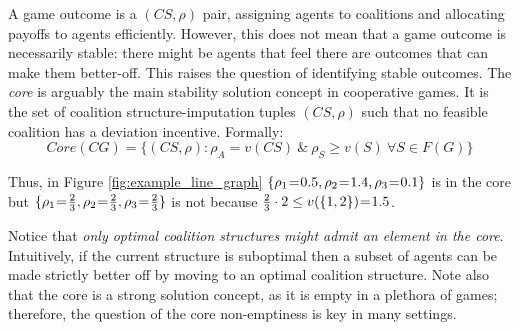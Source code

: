 \documentclass{aamas2012}
\begin{document}
A game outcome is a $(CS,\rho)$ pair, assigning agents to
coalitions and allocating payoffs to agents efficiently. However, this does not
mean that a game outcome is necessarily stable: there might be agents that feel
there are outcomes that can make them better-off. This raises the question of
identifying stable outcomes. The {\em core} is arguably the main stability
solution concept in cooperative games. It is the set of coalition
structure-imputation tuples $(CS, \rho)$ such that no feasible coalition has a
deviation incentive. Formally:
$$
Core(CG) = \{ (CS,\rho) : \rho_A = v(CS) \ \& \ \rho_{S} \geq v(S) \
\forall S \in F(G)\}
$$

\noindent Thus, in Figure \ref{fig:example_line_graph} 
$\{\rho_1\hspace{-0.03in}=\hspace{-0.03in}0.5,
\rho_2\hspace{-0.03in}=\hspace{-0.03in}1.4, \rho_3\hspace{-0.03in}
=\hspace{-0.03in}0.1\}$ is in the core but 
$\{\rho_1\hspace{-0.03in}=\hspace{-0.03in}\frac{2}{3},
\rho_2\hspace{-0.03in}=\hspace{-0.03in}\frac{2}{3}, \rho_3\hspace{-0.03in}
=\hspace{-0.03in}\frac{2}{3}\}$ is not because $\frac{2}{3}\cdot 2 \leq
v(\{1,2\})\hspace{-0.03in}=\hspace{-0.03in}1.5$.

Notice that {\em only optimal coalition structures might admit an element in the core}. Intuitively, if the current structure is suboptimal
then a subset of agents can be made strictly better off by moving to an optimal coalition structure.
Note also that the core is a strong solution concept, as it is empty in a plethora of games; therefore, the question
of the core non-emptiness is key in many settings.
\end{document}
